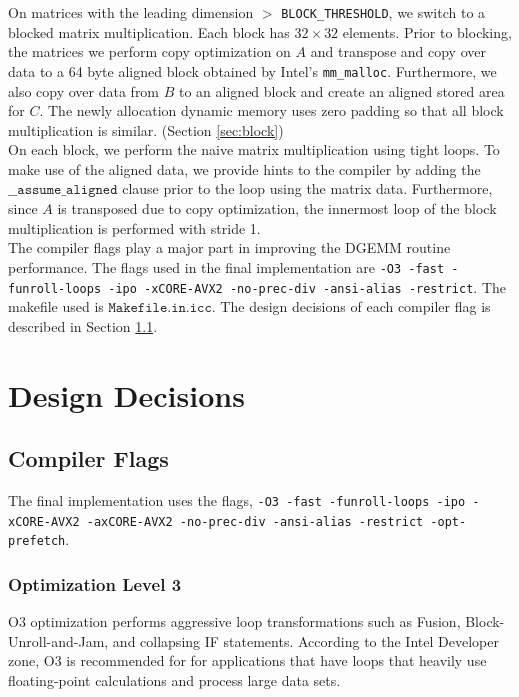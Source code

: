 \documentclass[11pt]{article}
\begin{document}
On matrices with the leading dimension $>$ \texttt{BLOCK\_THRESHOLD}, we switch to a blocked matrix multiplication. Each block has $32 \times 32$ elements. Prior to blocking, the matrices we perform copy optimization on $A$ and transpose and copy over data to a 64 byte aligned block obtained by Intel's \texttt{mm\_malloc}. Furthermore, we also copy over data from $B$ to an aligned block and create an aligned stored area for $C$. The newly allocation dynamic memory uses zero padding so that all block multiplication is similar. (Section \ref{sec:block}) \\

On each block, we perform the naive matrix multiplication using tight loops. To make use of the aligned data, we provide hints to the compiler by adding the $\texttt{\_\_assume\_aligned}$ clause prior to the loop using the matrix data. \cite{vectorization} Furthermore, since $A$ is transposed due to copy optimization, the innermost loop of the block multiplication is performed with stride 1. \\

The compiler flags play a major part in improving the DGEMM routine performance. The flags used in the final implementation are \texttt{-O3 -fast -funroll-loops -ipo -xCORE-AVX2 -no-prec-div -ansi-alias -restrict}. The makefile used is $\texttt{Makefile.in.icc}$. The design decisions of each compiler flag is described in Section \ref{sec:comp_flags}.

\section{Design Decisions}
\subsection{Compiler Flags}\label{sec:comp_flags}

The final implementation uses the flags, \texttt{-O3 -fast -funroll-loops -ipo -xCORE-AVX2 -axCORE-AVX2 -no-prec-div -ansi-alias -restrict -opt-prefetch}.
\subsubsection{Optimization Level 3}
O3 optimization performs aggressive loop transformations such as Fusion, Block-Unroll-and-Jam, and collapsing IF statements. According to the Intel Developer zone, \cite{stepbystep} O3 is recommended for for applications that have loops that heavily use floating-point calculations and process large data sets.
\end{document}
